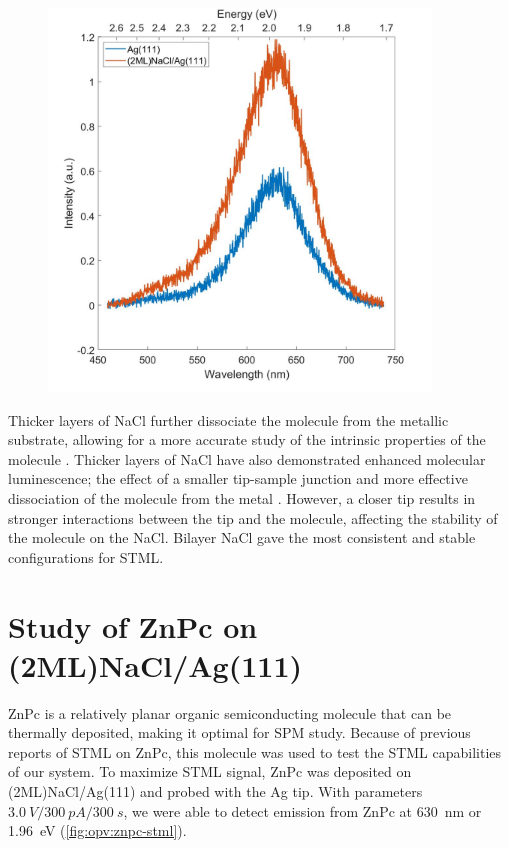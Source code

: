 \begin{figure} [h]
    \centering
    \includegraphics[width=4in]{pictures/NaCl_enhancement_Ag111_275V_250pA_10s.jpg}
    \caption{}
    \label{fig:opv:nacl-plasmon}
\end{figure}

Thicker layers of NaCl further dissociate the molecule from the metallic substrate, allowing for a more accurate study of the intrinsic properties of the molecule \citep{repp2005molecules}. Thicker layers of NaCl have also demonstrated enhanced molecular luminescence; the effect of a smaller tip-sample junction and more effective dissociation of the molecule from the metal \citep{Zhang2017,Kroger2018}. However, a closer tip results in stronger interactions between the tip and the molecule, affecting the stability of the molecule on the NaCl. Bilayer NaCl gave the most consistent and stable configurations for \ac{STML}.



\section{Study of {ZnPc} on (2ML)NaCl/Ag(111)}

\ac{ZnPc} is a relatively planar organic semiconducting molecule that can be thermally deposited, making it optimal for \ac{SPM} study. Because of previous reports of \ac{STML} on ZnPc, this molecule was used to test the \ac{STML} capabilities of our system. To maximize \ac{STML} signal, ZnPc was deposited on (2ML)NaCl/Ag(111) and probed with the Ag tip. With parameters $\SI{3.0}{V}/\SI{300}{pA}/\SI{300}{s}$, we were able to detect emission from ZnPc at \SI{630}{nm} or \SI{1.96}{eV} (\autoref{fig:opv:znpc-stml}).

